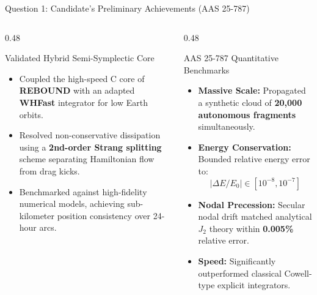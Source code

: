 \documentclass[aspectratio=169,10pt]{beamer}
\begin{document}
\begin{frame}{Question 1: Candidate's Preliminary Achievements (AAS 25-787)}
    \begin{columns}[t]
        \begin{column}{0.48\textwidth}
            \begin{block}{Validated Hybrid Semi-Symplectic Core}
                \small
                \begin{itemize}
                    \setlength{\itemsep}{3pt}
                    \item Coupled the high-speed C core of \textbf{REBOUND} with an adapted \textbf{WHFast} integrator for low Earth orbits.
                    \item Resolved non-conservative dissipation using a \textbf{2nd-order Strang splitting} scheme separating Hamiltonian flow from drag kicks.
                    \item Benchmarked against high-fidelity numerical models, achieving sub-kilometer position consistency over 24-hour arcs.
                \end{itemize}
            \end{block}
        \end{column}

        \begin{column}{0.48\textwidth}
            \begin{block}{AAS 25-787 Quantitative Benchmarks}
                \small
                \begin{itemize}
                    \setlength{\itemsep}{3pt}
                    \item \textbf{Massive Scale:} Propagated a synthetic cloud of \textbf{20,000 autonomous fragments} simultaneously.
                    \item \textbf{Energy Conservation:} Bounded relative energy error to:
                    $$\left| \Delta E / E_0 \right| \in [10^{-8}, 10^{-7}]$$
                    \item \textbf{Nodal Precession:} Secular nodal drift matched analytical $J_2$ theory within \textbf{0.005\%} relative error.
                    \item \textbf{Speed:} Significantly outperformed classical Cowell-type explicit integrators.
                \end{itemize}
            \end{block}
        \end{column}
    \end{columns}
\end{frame}
\end{document}
